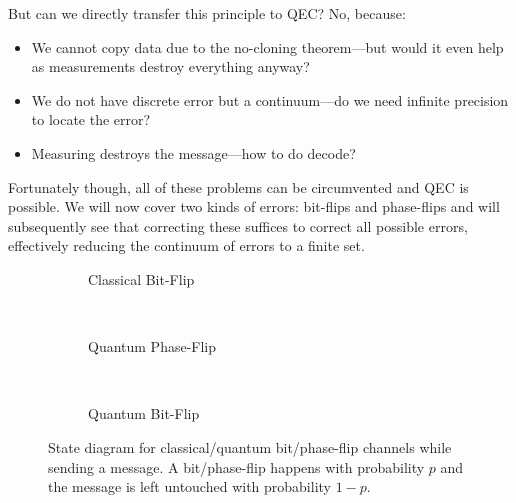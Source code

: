 	But can we directly transfer this principle to \ac{QEC}? No, because:
	\begin{itemize}
		\item We cannot copy data due to the no-cloning theorem---but would it even help as measurements destroy everything anyway?
		\item We do not have discrete error but a continuum---do we need infinite precision to locate the error?
		\item Measuring destroys the message---how to do decode?
	\end{itemize}
	Fortunately though, all of these problems can be circumvented and \ac{QEC} is possible. We will now cover two kinds of errors: bit-flips and phase-flips and will subsequently see that correcting these suffices to correct all possible errors, effectively reducing the continuum of errors to a finite set.

	\begin{figure}
		\centering
		\begin{subfigure}[b]{0.3\linewidth}
			\centering
			\caption{Classical Bit-Flip}
			\label{fig:bitFlipChannelClassical}
		\end{subfigure}
		~
		\begin{subfigure}[b]{0.3\linewidth}
			\centering
			\caption{Quantum Phase-Flip}
			\label{fig:bitFlipChannelQuantum}
		\end{subfigure}
		~
		\begin{subfigure}[b]{0.3\linewidth}
			\centering
			\caption{Quantum Bit-Flip}
			\label{fig:phaseFlipChannelQuantum}
		\end{subfigure}
		\caption[Bit/Phase-Flip Channels]{State diagram for classical/quantum bit/phase-flip channels while sending a message. A bit/phase-flip happens with probability \(p\) and the message is left untouched with probability \(1 - p\).}
		\label{fig:flipChannel}
	\end{figure}

